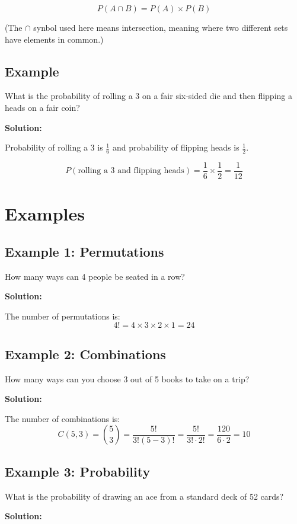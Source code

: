 \documentclass[12pt]{article}
\begin{document}
\[P(A \cap B) = P(A) \times P(B)\]

(The $\cap$ synbol used here means intersection, meaning where two different sets have elements in common.)

\subsection*{Example}

What is the probability of rolling a 3 on a fair six-sided die and then flipping a heads on a fair coin?

\textbf{Solution:}

Probability of rolling a 3 is \( \frac{1}{6} \) and probability of flipping heads is \( \frac{1}{2} \).

\[P(\text{rolling a 3 and flipping heads}) = \frac{1}{6} \times \frac{1}{2} = \frac{1}{12}\]

\section*{Examples}

\subsection*{Example 1: Permutations}

How many ways can 4 people be seated in a row?

\textbf{Solution:}

The number of permutations is:
\[4! = 4 \times 3 \times 2 \times 1 = 24\]

\subsection*{Example 2: Combinations}

How many ways can you choose 3 out of 5 books to take on a trip?

\textbf{Solution:}

The number of combinations is:
\[C(5, 3) = \binom{5}{3} = \frac{5!}{3!(5-3)!} = \frac{5!}{3! \cdot 2!} = \frac{120}{6 \cdot 2} = 10\]

\subsection*{Example 3: Probability}

What is the probability of drawing an ace from a standard deck of 52 cards?

\textbf{Solution:}
\end{document}

